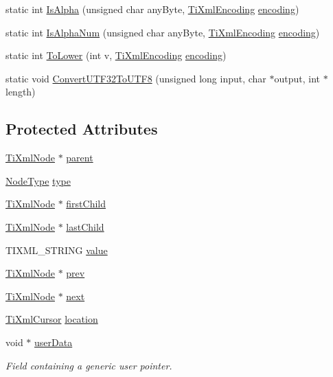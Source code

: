 \begin{DoxyCompactItemize}
\item 
static int \hyperlink{classTiXmlBase_ae22522b2e8e1ac43102d16394f639fc8}{IsAlpha} (unsigned char anyByte, \hyperlink{tinyxml_8h_a88d51847a13ee0f4b4d320d03d2c4d96}{TiXmlEncoding} \hyperlink{classTiXmlDeclaration_a24b8645d7696ec169bbb3fb7d30860cf}{encoding})
\item 
static int \hyperlink{classTiXmlBase_a321919055c115c78ded17f85a793f368}{IsAlphaNum} (unsigned char anyByte, \hyperlink{tinyxml_8h_a88d51847a13ee0f4b4d320d03d2c4d96}{TiXmlEncoding} \hyperlink{classTiXmlDeclaration_a24b8645d7696ec169bbb3fb7d30860cf}{encoding})
\item 
static int \hyperlink{classTiXmlBase_a799f17405a86a5c2029618e85f11a097}{ToLower} (int v, \hyperlink{tinyxml_8h_a88d51847a13ee0f4b4d320d03d2c4d96}{TiXmlEncoding} \hyperlink{classTiXmlDeclaration_a24b8645d7696ec169bbb3fb7d30860cf}{encoding})
\item 
static void \hyperlink{classTiXmlBase_a07c765e3a7f979d343e646ea797b180b}{ConvertUTF32ToUTF8} (unsigned long input, char $\ast$output, int $\ast$length)
\end{DoxyCompactItemize}
\subsection*{Protected Attributes}
\begin{DoxyCompactItemize}
\item 
\hyperlink{classTiXmlNode}{TiXmlNode} $\ast$ \hyperlink{classTiXmlNode_a662c4de61244e4fa5bd4e2d8c63143a5}{parent}
\item 
\hyperlink{classTiXmlNode_a836eded4920ab9e9ef28496f48cd95a2}{NodeType} \hyperlink{classTiXmlNode_a2619c6379181c16ba95ae6922e2ca839}{type}
\item 
\hyperlink{classTiXmlNode}{TiXmlNode} $\ast$ \hyperlink{classTiXmlNode_af749fb7f22010b80e8f904c32653d50e}{firstChild}
\item 
\hyperlink{classTiXmlNode}{TiXmlNode} $\ast$ \hyperlink{classTiXmlNode_a5b30756d21b304580d22a841ec9d61f8}{lastChild}
\item 
TIXML\_\-STRING \hyperlink{classTiXmlNode_aead528b3cedc33c16a6c539872c7cc8b}{value}
\item 
\hyperlink{classTiXmlNode}{TiXmlNode} $\ast$ \hyperlink{classTiXmlNode_a9c5370ea2cbfd9f0e0f7b30a57fd68f5}{prev}
\item 
\hyperlink{classTiXmlNode}{TiXmlNode} $\ast$ \hyperlink{classTiXmlNode_a2f329cc993d2d34df76e17dcbb776b45}{next}
\item 
\hyperlink{structTiXmlCursor}{TiXmlCursor} \hyperlink{classTiXmlBase_a0d992580f3bc264909f898e942677a3c}{location}
\item 
void $\ast$ \hyperlink{classTiXmlBase_ab242c01590191f644569fa89a080d97c}{userData}
\begin{DoxyCompactList}\small\item\em Field containing a generic user pointer. \item\end{DoxyCompactList}\end{DoxyCompactItemize}
